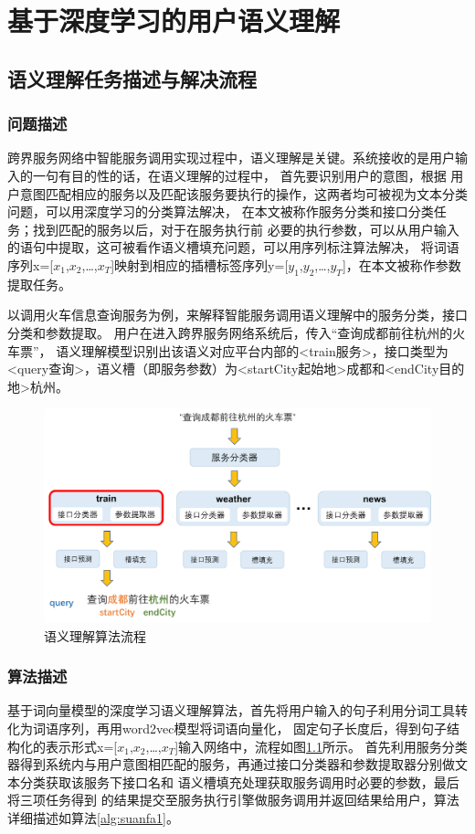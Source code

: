 \chapter{基于深度学习的用户语义理解}

\section{语义理解任务描述与解决流程}
\subsection{问题描述}
跨界服务网络中智能服务调用实现过程中，语义理解是关键。系统接收的是用户输入的一句有目的性的话，在语义理解的过程中，
首先要识别用户的意图，根据
用户意图匹配相应的服务以及匹配该服务要执行的操作，这两者均可被视为文本分类问题，可以用深度学习的分类算法解决，
在本文被称作服务分类和接口分类任务；找到匹配的服务以后，对于在服务执行前
必要的执行参数，可以从用户输入的语句中提取，这可被看作语义槽填充问题，可以用序列标注算法解决，
将词语序列x=[$x_{1}$,$x_{2}$,\dots,$x_{T}$]映射到相应的插槽标签序列y=[$y_{1}$,$y_{2}$,\dots,$y_{T}$]，在本文被称作参数提取任务。

以调用火车信息查询服务为例，来解释智能服务调用语义理解中的服务分类，接口分类和参数提取。
用户在进入跨界服务网络系统后，传入“查询成都前往杭州的火车票”，
语义理解模型识别出该语义对应平台内部的<train服务>，接口类型为<query查询>，语义槽（即服务参数）为<startCity起始地>成都和<endCity目的地>杭州。


\begin{figure}[htbp]
    \centering
    \includegraphics[scale=0.5]{./images/liucheng.png}
    \caption{语义理解算法流程}
    \label{fig:questiondesc}
  \end{figure}

\subsection{算法描述}
基于词向量模型的深度学习语义理解算法，首先将用户输入的句子利用分词工具转化为词语序列，再用word2vec模型将词语向量化，
固定句子长度后，得到句子结构化的表示形式x=[$x_{1}$,$x_{2}$,\dots,$x_{T}$]输入网络中，流程如图\ref{fig:questiondesc}所示。
首先利用服务分类器得到系统内与用户意图相匹配的服务，再通过接口分类器和参数提取器分别做文本分类获取该服务下接口名和
语义槽填充处理获取服务调用时必要的参数，最后将三项任务得到
的结果提交至服务执行引擎做服务调用并返回结果给用户，算法详细描述如算法\ref{alg:suanfa1}。


